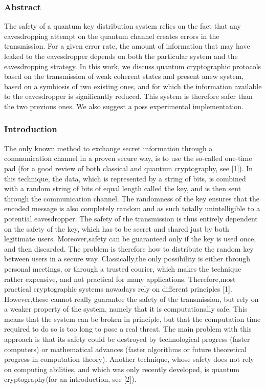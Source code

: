 \subsubsection*{Abstract}
The safety of a quantum key distribution system relies on the fact that any eavesdropping attempt on the quantum channel creates errors in the transmission. For a given error rate, the amount of information that may have leaked to the eavesdropper depends on both the particular system and the eavesdropping strategy. In this work, we discuss quantum cryptographic protocols based on the transmission of weak coherent states and present anew system, based on a symbiosis of two existing ones, and for which the information available to the eavesdropper is significantly reduced. This system is therefore safer than the two previous ones. We also suggest a poss experimental implementation.

\subsubsection*{Introduction}
The only known method to exchange secret information through a communication channel in a proven secure way, is to use the so-called one-time pad (for a good review of both classical and quantum cryptography, see [1]). In this technique, the data, which is represented by a string of bits, is combined with a random string of bits of equal length called the key, and is then sent through the communication channel. The randomness of the key ensures that the encoded message is also completely random and as such totally unintelligible to a potential eavesdropper. The safety of the transmission is thus entirely dependent on the safety of the key, which has to be secret and shared just by both legitimate users. Moreover,safety can be guaranteed only if the key is used once, and then discarded. The problem is therefore how to distribute the random key between users in a secure way. Classically,the only possibility is either through personal meetings, or through a trusted courier, which makes the technique rather expensive, and not practical for many applications. Therefore,most practical cryptographic systems nowadays rely on different principles [1]. However,these cannot really guarantee the safety of the transmission, but rely on a weaker property of the system, namely that it is computationally safe. This means that the system can be broken in principle, but that the computation time required to do so is too long to pose a real threat. The main problem with this approach is that its safety could be destroyed by technological progress (faster computers) or mathematical advances (faster algorithms or future theoretical progress in computation theory). Another technique, whose safety does not rely on computing abilities, and which was only recently developed, is quantum cryptography(for an introduction, see [2]).


